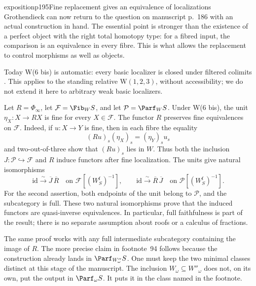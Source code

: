 \begin{dcomment}{exposition}{p195}{Fine replacement gives an equivalence of localizations}
Grothendieck can now return to the question on manuscript p.~186 with an actual construction in hand. The essential point is stronger than the existence of a perfect object with the right total homotopy type: for a fibred input, the comparison is an equivalence in every fibre. This is what allows the replacement to control morphisms as well as objects.

Today W(6 bis) is automatic: every basic localizer is closed under filtered colimits \citep[Corollary~4.2.22]{Cisinski2006}. This applies to the standing relative W$(1,2,3)$, without accessibility; we do not extend it here to arbitrary weak basic localizers.

Let $R=\Phi_\infty$, let $\mathcal F=\Fib_W S$, and let $\mathcal P=\Parf_W S$. Under W(6 bis), the unit $\eta_X:X\to RX$ is fine for every $X\in\mathcal F$. The functor $R$ preserves fine equivalences on $\mathcal F$. Indeed, if $u:X\to Y$ is fine, then in each fibre the equality
\[
 (Ru)_s(\eta_X)_s=(\eta_Y)_s u_s
\]
and two-out-of-three show that $(Ru)_s$ lies in $W$. Thus both the inclusion $J:\mathcal P\hookrightarrow\mathcal F$ and $R$ induce functors after fine localization. The units give natural isomorphisms
\[
 \mathrm{id}\xrightarrow{\sim}\overline J\,\overline R
 \quad\text{on }\mathcal F[(W_S^{\mathrm f})^{-1}],
 \qquad
 \mathrm{id}\xrightarrow{\sim}\overline R\,\overline J
 \quad\text{on }\mathcal P[(W_S^{\mathrm f})^{-1}].
\]
For the second assertion, both endpoints of the unit belong to $\mathcal P$, and the subcategory is full. These two natural isomorphisms prove that the induced functors are quasi-inverse equivalences. In particular, full faithfulness is part of the result; there is no separate assumption about roofs or a calculus of fractions.

The same proof works with any full intermediate subcategory containing the image of $R$. The more precise claim in footnote~94 follows because the construction already lands in $\Parf_{W''_\omega}S$. One must keep the two minimal classes distinct at this stage of the manuscript. The inclusion $W_\omega\subseteq W''_\omega$ does not, on its own, put the output in $\Parf_\omega S$. It puts it in the class named in the footnote.


\end{dcomment}
